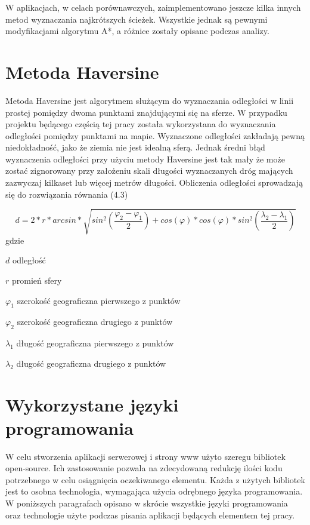 W aplikacjach, w celach porównawczych, zaimplementowano jeszcze kilka innych metod wyznaczania najkrótszych ścieżek. Wszystkie jednak są pewnymi modyfikacjami algorytmu A*, a różnice zostały opisane podczas analizy.

\section{Metoda Haversine}

Metoda Haversine jest algorytmem służącym do wyznaczania odległości w linii prostej pomiędzy dwoma punktami znajdującymi się na sferze. W przypadku projektu będącego częścią tej pracy została wykorzystana do wyznaczania odległości pomiędzy punktami na mapie. Wyznaczone odległości zakładają pewną niedokładność, jako że ziemia nie jest idealną sferą. Jednak średni błąd wyznaczenia odległości przy użyciu metody Haversine jest tak mały że może zostać zignorowany przy założeniu skali długości wyznaczanych dróg mających zazwyczaj kilkaset lub więcej metrów długości.\newline
Obliczenia odległości sprowadzają się do rozwiązania równania (4.3)

\begin{equation}
d=2*r*arcsin*\sqrt{sin^2(\frac{\varphi_{2}-\varphi_{1}}{2}) + cos(\varphi)*cos(\varphi)*sin^2(\frac{\lambda_{2}-\lambda_{1}}{2})}
\end{equation}
gdzie
\begin{eqwhere}[2cm]
	\item[$d$] odległość
	\item[$r$] promień sfery
	\item[$\varphi_{1}$] szerokość geograficzna pierwszego z punktów 
	\item[$\varphi_{2}$]  szerokość geograficzna drugiego z punktów 
	\item[$\lambda_{1}$] długość geograficzna pierwszego z punktów 
	\item[$\lambda_{2}$] długość geograficzna drugiego z punktów
\end{eqwhere}

\section{Wykorzystane języki programowania}

W celu stworzenia aplikacji serwerowej i strony www użyto szeregu bibliotek open-source. Ich zastosowanie pozwala na zdecydowaną redukcję ilości kodu potrzebnego w celu osiągnięcia oczekiwanego elementu. Każda z użytych bibliotek jest to osobna technologia, wymagająca użycia odrębnego języka programowania. W poniższych paragrafach opisano w skrócie wszystkie języki programowania oraz technologie użyte podczas pisania aplikacji będących elementem tej pracy.

